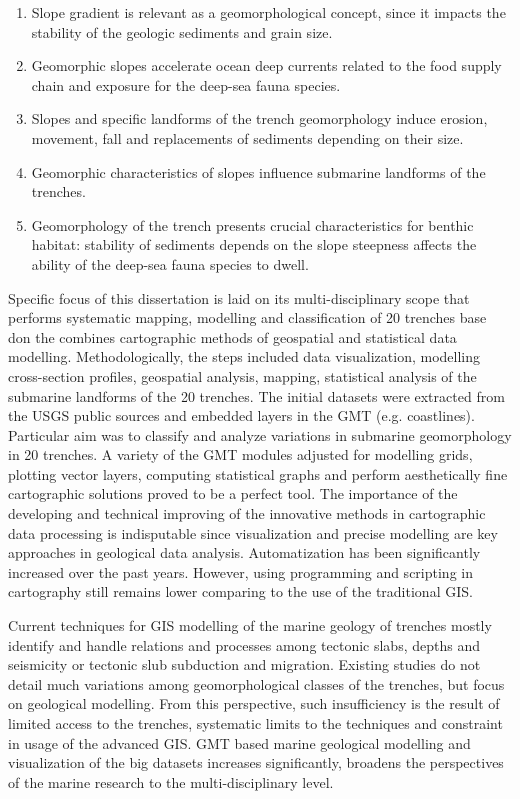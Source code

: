 \documentclass[11pt,a4paper]{report}
\begin{document}
{\begin{enumerate}
	\item Slope gradient is relevant as a geomorphological concept, since it impacts the stability of the geologic sediments and grain size. 
	\item Geomorphic slopes accelerate ocean deep currents related to the food supply chain and exposure for the deep-sea fauna species. 
	\item Slopes and specific landforms of the trench geomorphology induce erosion, movement, fall and replacements of sediments depending on their size. 
	\item Geomorphic characteristics of slopes influence submarine landforms of the trenches. 
	\item Geomorphology of the trench presents crucial characteristics for benthic habitat: stability of sediments depends on the slope steepness affects the ability of the deep-sea fauna species to dwell. 
\end{enumerate}

Specific focus of this dissertation is laid on its multi-disciplinary scope that performs systematic mapping, modelling and classification of 20 trenches base don the combines cartographic methods of geospatial and statistical data modelling. Methodologically, the steps included data visualization, modelling cross-section profiles, geospatial analysis, mapping, statistical analysis of the submarine landforms of the 20 trenches. The initial datasets were extracted from the \ac{USGS} public sources and embedded layers in the \ac{GMT} (e.g. coastlines). Particular aim was to classify and analyze variations in submarine geomorphology in 20 trenches. 
A variety of the \ac{GMT} modules \cite{Wesseletal2013} adjusted for modelling grids, plotting vector layers, computing statistical graphs and perform aesthetically fine cartographic solutions proved to be a perfect tool. The importance of the developing and technical improving of the innovative methods in cartographic data processing is indisputable since visualization and precise modelling are key approaches in geological data analysis. Automatization has been significantly increased over the past years. However, using programming and scripting in cartography still remains lower comparing to the use of the traditional \ac{GIS}. 

Current techniques for GIS modelling of the marine geology of trenches mostly identify and handle relations and processes among tectonic slabs, depths and seismicity \cite{Raneroetal2005} or tectonic slub subduction and migration. Existing studies do not detail much variations among geomorphological classes of the trenches, but focus on geological modelling. From this perspective, such insufficiency is the result of limited access to the trenches, systematic limits to the techniques and constraint in usage of the advanced \ac{GIS}. \ac{GMT} based marine geological modelling and visualization of the big datasets increases significantly, broadens the perspectives of the marine research to the multi-disciplinary level. 

}
\end{document}
